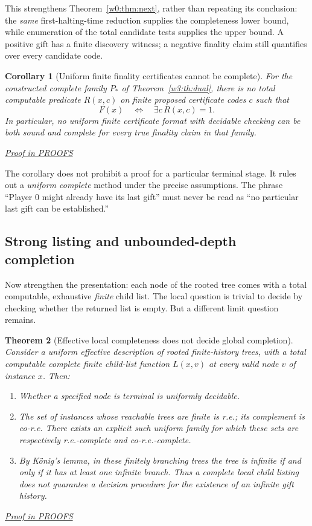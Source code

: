 \documentclass[11pt,letterpaper]{article}
\newtheorem{theorem}{Theorem}[section]
\newtheorem{corollary}[theorem]{Corollary}
\theoremstyle{definition}\newtheorem{definition}[theorem]{Definition}\newtheorem{example}[theorem]{Example}
\theoremstyle{remark}\newtheorem{remark}[theorem]{Remark}
\newcommand{\prooflink}[1]{\par\noindent\hfill\small\hyperref[#1]{\textit{Proof in PROOFS}}\normalsize}
\begin{document}
This strengthens Theorem~\ref{w0:thm:next}, rather than repeating its
conclusion: the \emph{same} first-halting-time reduction supplies the
completeness lower bound, while enumeration of the total candidate tests
supplies the upper bound. A positive gift has a finite discovery witness;
a negative finality claim still quantifies over every candidate code.

\begin{corollary}[Uniform finite finality certificates cannot be complete]\label{w3:co:cert}
For the constructed complete family $P_*$ of Theorem~\ref{w3:th:dual}, there is no total computable predicate $R(x,c)$ on finite proposed certificate codes $c$ such that
\[
 F(x)\quad\Longleftrightarrow\quad\exists c\,R(x,c)=1.
\]
In particular, no uniform finite certificate format with decidable checking can be both sound and complete for every true finality claim in that family.
\prooflink{w3:pr:cert}
\end{corollary}

The corollary does not prohibit a proof for a particular terminal stage. It rules out a \emph{uniform complete} method under the precise assumptions. The phrase ``Player 0 might already have its last gift'' must never be read as ``no particular last gift can be established.''

\subsection{Strong listing and unbounded-depth completion}
Now strengthen the presentation: each node of the rooted tree comes with a total computable, exhaustive \emph{finite} child list. The local question is trivial to decide by checking whether the returned list is empty. But a different limit question remains.

\begin{theorem}[Effective local completeness does not decide global completion]\label{w3:th:tree}
Consider a uniform effective description of rooted finite-history trees, with a total computable complete finite child-list function $L(x,v)$ at every valid node $v$ of instance $x$. Then:
\begin{enumerate}[label=\textup{(\roman*)}]
\item Whether a specified node is terminal is uniformly decidable.
\item The set of instances whose reachable trees are finite is r.e.; its complement is co-r.e. There exists an explicit such uniform family for which these sets are respectively r.e.-complete and co-r.e.-complete.
\item By K\"onig's lemma, in these finitely branching trees the tree is infinite if and only if it has at least one infinite branch. Thus a complete local child listing does not guarantee a decision procedure for the existence of an infinite gift history.
\end{enumerate}
\prooflink{w3:pr:tree}
\end{theorem}
\end{document}
